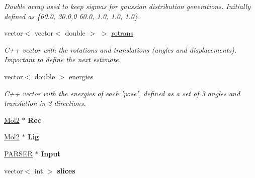 \begin{DoxyCompactItemize}
\begin{DoxyCompactList}\small\item\em Double array used to keep sigmas for gaussian distribution generations. Initially defined as \{60.0, 30.0,0 60.0, 1.0, 1.0, 1.0\}. \item\end{DoxyCompactList}\item 
\hypertarget{classDeal_a11b9859d6624186ecc75aad21b30791a}{
vector$<$ vector$<$ double $>$ $>$ \hyperlink{classDeal_a11b9859d6624186ecc75aad21b30791a}{rotrans}}
\label{classDeal_a11b9859d6624186ecc75aad21b30791a}

\begin{DoxyCompactList}\small\item\em C++ vector with the rotations and translations (angles and displacements). Important to define the next estimate. \item\end{DoxyCompactList}\item 
\hypertarget{classDeal_a7088d41426d89d85d70893b8aae6c171}{
vector$<$ double $>$ \hyperlink{classDeal_a7088d41426d89d85d70893b8aae6c171}{energies}}
\label{classDeal_a7088d41426d89d85d70893b8aae6c171}

\begin{DoxyCompactList}\small\item\em C++ vector with the energies of each 'pose', defined as a set of 3 angles and translation in 3 directions. \item\end{DoxyCompactList}\item 
\hypertarget{classDeal_a2395c32eb3258cbe9835caa3c774086b}{
\hyperlink{classMol2}{Mol2} $\ast$ {\bfseries Rec}}
\label{classDeal_a2395c32eb3258cbe9835caa3c774086b}

\item 
\hypertarget{classDeal_ae3fc38342edb04056cf06023e1ac942b}{
\hyperlink{classMol2}{Mol2} $\ast$ {\bfseries Lig}}
\label{classDeal_ae3fc38342edb04056cf06023e1ac942b}

\item 
\hypertarget{classDeal_a7a0b4be112eef19bdad0e31de7364861}{
\hyperlink{classPARSER}{PARSER} $\ast$ {\bfseries Input}}
\label{classDeal_a7a0b4be112eef19bdad0e31de7364861}

\item 
\hypertarget{classDeal_a3777429077011fe2e04ef41266d7dc93}{
vector$<$ int $>$ {\bfseries slices}}
\label{classDeal_a3777429077011fe2e04ef41266d7dc93}


\end{DoxyCompactItemize}

